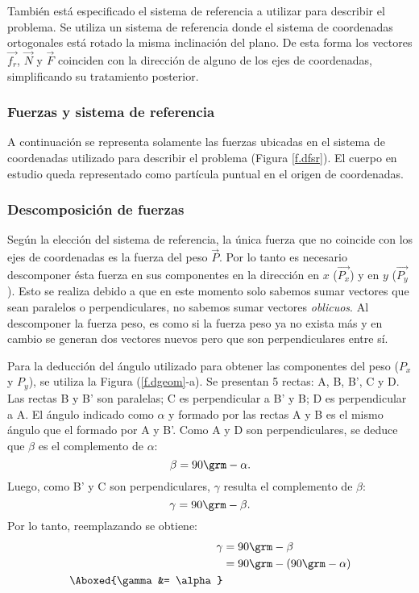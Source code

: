 \begin{figure}[!ht]
  
\end{figure}

También está especificado el sistema de referencia a utilizar para describir el
problema. Se utiliza un sistema de referencia donde el sistema de
coordenadas ortogonales está rotado la misma inclinación del plano. De esta
forma los vectores $\vec{f_r}$, $\vec{N}$ y $\vec{F}$ coinciden con la dirección
de alguno de los ejes de coordenadas, simplificando su tratamiento posterior.

\subsubsection{Fuerzas y sistema de referencia}

A continuación se representa solamente las fuerzas ubicadas en el sistema de
coordenadas utilizado para describir el problema (Figura \ref{f.dfsr}). El
cuerpo en estudio queda representado como partícula puntual en el origen de
coordenadas.

\begin{figure}[!ht]
  
\end{figure}

\subsubsection{Descomposición de fuerzas}

Según la elección del sistema de referencia, la única fuerza que no coincide con
los ejes de coordenadas es la fuerza del peso $\vec{P}$. Por lo tanto es
necesario descomponer ésta fuerza en sus componentes en la dirección en $x$
($\vec{P_x}$) y en $y$ ($\vec{P_y}$). Esto se realiza debido a que en este
momento solo sabemos sumar vectores que sean paralelos o perpendiculares, no
sabemos sumar vectores \emph{oblicuos}. Al descomponer la fuerza peso, es como
si la fuerza peso ya no exista más y en cambio se generan dos vectores nuevos
pero que son perpendiculares entre sí.


\begin{figure}[!ht]
  
\end{figure}

Para la deducción del ángulo utilizado para obtener las componentes del peso
($P_x$ y $P_y$), se utiliza la Figura (\ref{f.dgeom}-a). Se presentan 5 rectas:
A, B, B', C y D. Las rectas B y B' son paralelas; C es perpendicular a B' y B; D
es perpendicular a A. El ángulo indicado como $\alpha$ y formado por las rectas
A y B es el mismo ángulo que el formado por A y B'. Como A y D son
perpendiculares, se deduce que $\beta$ es el complemento de $\alpha$:
\[
  \beta= 90\grm - \alpha.
\]
Luego, como B' y C son perpendiculares, $\gamma$ resulta el complemento de
$\beta$: 
\[
  \gamma = 90\grm - \beta. 
\]
Por lo tanto, reemplazando se obtiene:
\begin{align} \label{e.1}
  \gamma &= 90\grm - \beta \nonumber \\
  &= 90\grm - (90\grm - \alpha) \nonumber \\
  \Aboxed{\gamma &= \alpha}
\end{align}

